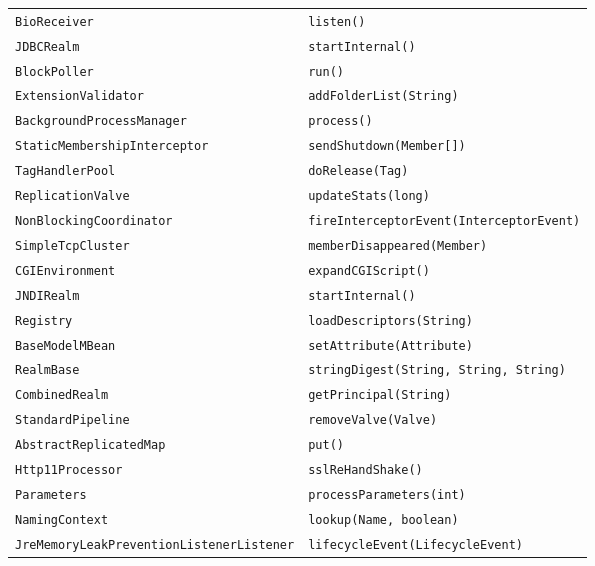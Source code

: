 \begin{center}
\begin{longtable}{ll}
\lstinline/BioReceiver/&{\hspace*{-1.5pt}\lstinline/listen()/}\\
\lstinline/JDBCRealm/&{\hspace*{-3pt}\lstinline/startInternal()/}\\
\lstinline/BlockPoller/&{\lstinline/run()/}\\
\lstinline/ExtensionValidator/&{\lstinline/addFolderList(String)/}\\
\lstinline/BackgroundProcessManager/&{\lstinline/process()/}\\
\lstinline/StaticMembershipInterceptor/&{\lstinline/sendShutdown(Member[])/}\\
\lstinline/TagHandlerPool/&{\lstinline/doRelease(Tag)/}\\
\lstinline/ReplicationValve/&{\lstinline/updateStats(long)/}\\
\lstinline/NonBlockingCoordinator/&{\lstinline/fireInterceptorEvent(InterceptorEvent)/}\\
\lstinline/SimpleTcpCluster/&{\lstinline/memberDisappeared(Member)/}\\
\lstinline/CGIEnvironment/&{\lstinline/expandCGIScript()/}\\
\lstinline/JNDIRealm/&{\hspace*{-3pt}\lstinline/startInternal()/}\\
\lstinline/Registry/&{\lstinline/loadDescriptors(String)/}\\
\lstinline/BaseModelMBean/&{\hspace*{-3pt}\lstinline/setAttribute(Attribute)/}\\
\lstinline/RealmBase/&{\hspace*{-1.5pt}\lstinline/stringDigest(String, String, String)/}\\
\lstinline/CombinedRealm/&{\lstinline/getPrincipal(String)/}\\
\lstinline/StandardPipeline/&{\lstinline/removeValve(Valve)/}\\
\lstinline/AbstractReplicatedMap/&{\lstinline/put()/}\\
\lstinline/Http11Processor/&{\lstinline/sslReHandShake()/}\\
\lstinline/Parameters/&{\lstinline/processParameters(int)/}\\
\lstinline/NamingContext/&{\lstinline/lookup(Name, boolean)/}\\
\lstinline/JreMemoryLeakPreventionListenerListener/&{\hspace*{-1.5pt}\lstinline/lifecycleEvent(LifecycleEvent)/}\\

\end{longtable}
\end{center}
